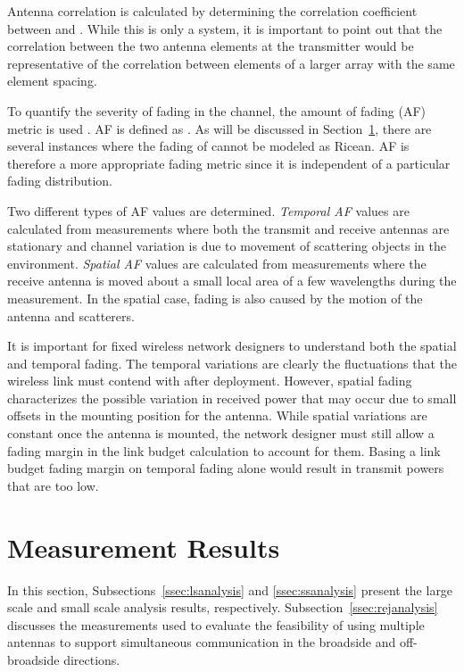 \documentclass[12pt]{IEEEtran}
\begin{document}
Antenna correlation is calculated by determining the correlation coefficient between  and .  While this is only a  system, it is important to point out that the correlation between the two antenna elements at the transmitter would be representative of the correlation between elements of a larger array with the same element spacing.

To quantify the severity of fading in the channel, the amount of fading (AF) metric is used \cite{alouini-2005}.  AF is defined as . As will be discussed in Section~\ref{sec:results}, there are several instances where the fading of  cannot be modeled as Ricean.  AF is therefore a more appropriate fading metric since it is independent of a particular fading distribution.

Two different types of AF values are determined.  {\em Temporal AF} values are calculated from measurements where both the transmit and receive antennas are stationary and channel variation is due to movement of scattering objects in the environment.  {\em Spatial AF} values are calculated from measurements where the receive antenna is moved about a small local area of a few wavelengths during the measurement.  In the spatial case, fading is also caused by the motion of the antenna and scatterers.

It is important for fixed wireless network designers to understand both the spatial and temporal fading.  The temporal variations are clearly the fluctuations that the wireless link must contend with after deployment.  However, spatial fading characterizes the possible variation in received power that may occur due to small offsets in the mounting position for the antenna.  While spatial variations are constant once the antenna is mounted, the network designer must still allow a fading margin in the link budget calculation to account for them.  Basing a link budget fading margin on temporal fading alone would result in transmit powers that are too low.


\section{Measurement Results}
\label{sec:results}

In this section, Subsections~\ref{ssec:lsanalysis} and \ref{ssec:ssanalysis} present the large scale and small scale analysis results, respectively.  Subsection~\ref{ssec:rejanalysis} discusses the measurements used to evaluate the feasibility of using multiple antennas to support simultaneous communication in the broadside and off-broadside directions.
\end{document}
